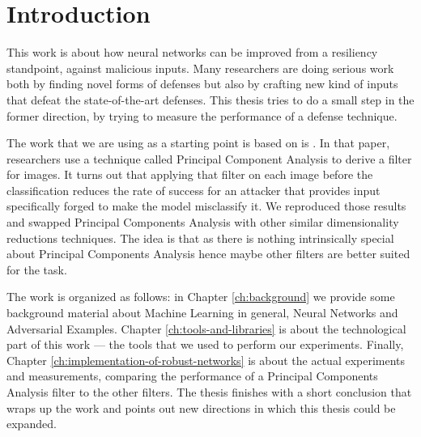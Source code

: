 \chapter*{Introduction}

This work is about how neural networks can be improved from a
resiliency standpoint, against malicious inputs. Many researchers are
doing serious work \cite{papernot2016cleverhans}
\cite{DBLP:journals/corr/KurakinGB16} \cite{carlini2017adversarial}
\cite{meng2017magnet} \cite{yuan2017adversarial} \cite{xu2017feature}
\cite{liao2018defense} both by finding novel forms of defenses but also
by crafting new kind of inputs that defeat the state-of-the-art
defenses. This thesis tries to do a small step in the former direction,
by trying to measure the performance of a defense technique.

The work that we are using as a starting point is based on is
\cite{bhagoji2018enhancing}. In that paper, researchers use a technique
called Principal Component Analysis to derive a filter for images. It
turns out that applying that filter on each image before the
classification reduces the rate of success for an attacker that
provides input specifically forged to make the model misclassify it. We
reproduced those results and swapped Principal Components Analysis with
other similar dimensionality reductions techniques. The idea is that as
there is nothing intrinsically special about Principal Components
Analysis hence maybe other filters are better suited for the task.

The work is organized as follows: in Chapter \ref{ch:background} we
provide some background material about Machine Learning in general,
Neural Networks and Adversarial Examples. Chapter
\ref{ch:tools-and-libraries} is about the technological part of this
work --- the tools that we used to perform our experiments. Finally,
Chapter \ref{ch:implementation-of-robust-networks} is about the actual
experiments and measurements, comparing the performance of a Principal
Components Analysis filter to the other filters. The thesis finishes
with a short conclusion that wraps up the work and points out new
directions in which this thesis could be expanded.
